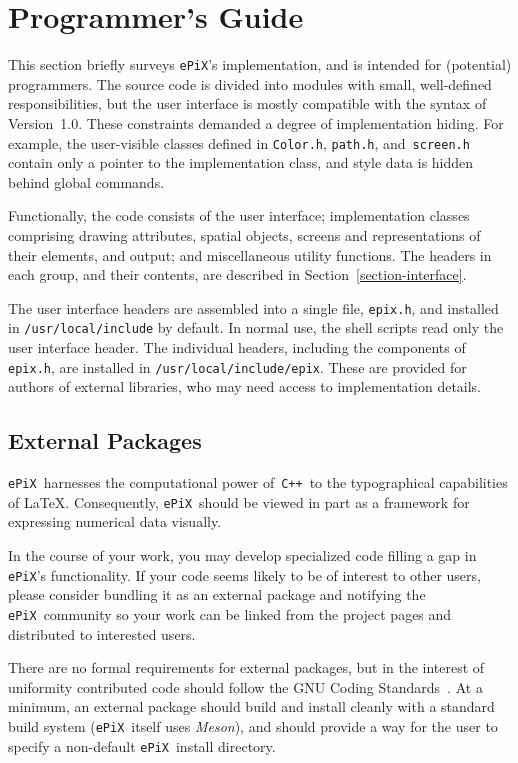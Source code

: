 \documentclass[12pt,letterpaper]{book}
\newcommand{\code}[1]{\texttt{#1}}
\newcommand{\filename}[1]{\texttt{#1}}
\newcommand{\ePiX}{\code{ePiX}}
\newcommand{\CXX}{\code{C++}}
\begin{document}
\section{Programmer's Guide}
\label{section-programmers}

This section briefly surveys \ePiX's implementation, and is intended
for (potential) programmers. The source code is divided into modules
with small, well-defined responsibilities, but the user interface is
mostly compatible with the syntax of Version~1.0. These constraints
demanded a degree of implementation hiding. For example, the
user-visible classes defined in \filename{Color.h}, \filename{path.h},
and~\filename{screen.h} contain only a pointer to the implementation
class, and style data is hidden behind global commands.

Functionally, the code consists of the user interface; implementation
class\-es comprising drawing attributes, spatial objects, screens and
representations of their elements, and output; and miscellaneous
utility functions. The headers in each group, and their contents, are
described in Section~\ref{section-interface}.

The user interface headers are assembled into a single file,
\filename{epix.h}, and installed in \filename{/usr/local/include} by
default. In normal use, the shell scripts read only the user interface
header.  The individual headers, including the components of
\filename{epix.h}, are installed in
\filename{/usr/local/include/epix}. These are provided for authors of
external libraries, who may need access to implementation details.


\subsection{External Packages}

\ePiX\ harnesses the computational power of~\CXX\ to the typographical
capabilities of \LaTeX. Consequently, \ePiX\ should be viewed in part
as a framework for expressing numerical data visually.

In the course of your work, you may develop specialized code filling a
gap in \ePiX's functionality. If your code seems likely to be of
interest to other users, please consider bundling it as an external
package and notifying the \ePiX\ community so your work can be linked
from the project pages and distributed to interested users.

There are no formal requirements for external packages, but in the
interest of uniformity contributed code should follow the GNU Coding
Standards~\cite{GNUCoding}. At a minimum, an external package should
build and install cleanly with a standard build system (\ePiX\ itself
uses \emph{Meson}), and should provide a way for the user to specify a
non-default \ePiX\ install directory.
\end{document}
